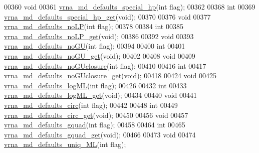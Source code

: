 \begin{DoxyCode}
00360 \textcolor{keywordtype}{void}
00361 \hyperlink{group__model__details_gafff6449a02744add0308e653230c15fc}{vrna\_md\_defaults\_special\_hp}(\textcolor{keywordtype}{int} flag);
00362 
00368 \textcolor{keywordtype}{int}
00369 \hyperlink{group__model__details_ga1d68a6efdaa1253cc63fd9cd06452559}{vrna\_md\_defaults\_special\_hp\_get}(\textcolor{keywordtype}{void});
00370 
00376 \textcolor{keywordtype}{void}
00377 \hyperlink{group__model__details_ga2f88ffc393ac9d7987849c965fd29ea8}{vrna\_md\_defaults\_noLP}(\textcolor{keywordtype}{int} flag);
00378 
00384 \textcolor{keywordtype}{int}
00385 \hyperlink{group__model__details_ga934344888fbacaed538bbbfe910f2aa6}{vrna\_md\_defaults\_noLP\_get}(\textcolor{keywordtype}{void});
00386 
00392 \textcolor{keywordtype}{void}
00393 \hyperlink{group__model__details_ga98218f85c7a957a1d1ddf4627fdf5a39}{vrna\_md\_defaults\_noGU}(\textcolor{keywordtype}{int} flag);
00394 
00400 \textcolor{keywordtype}{int}
00401 \hyperlink{group__model__details_ga5faa7d4e536d7fe36ec25428c0cf2563}{vrna\_md\_defaults\_noGU\_get}(\textcolor{keywordtype}{void});
00402 
00408 \textcolor{keywordtype}{void}
00409 \hyperlink{group__model__details_gade5b9951d71ca2fb357a4e6c0c18ccd1}{vrna\_md\_defaults\_noGUclosure}(\textcolor{keywordtype}{int} flag);
00410 
00416 \textcolor{keywordtype}{int}
00417 \hyperlink{group__model__details_ga4f7fdad083243a5348d63320ddaa70f3}{vrna\_md\_defaults\_noGUclosure\_get}(\textcolor{keywordtype}{void});
00418 
00424 \textcolor{keywordtype}{void}
00425 \hyperlink{group__model__details_ga3de50a73455d88c3957386933b8e1f90}{vrna\_md\_defaults\_logML}(\textcolor{keywordtype}{int} flag);
00426 
00432 \textcolor{keywordtype}{int}
00433 \hyperlink{group__model__details_ga93f04e070d529c5d0bb87c9681f6ad29}{vrna\_md\_defaults\_logML\_get}(\textcolor{keywordtype}{void});
00434 
00440 \textcolor{keywordtype}{void}
00441 \hyperlink{group__model__details_ga4e1deb3e91a8a99e5c6dd905a5eb0186}{vrna\_md\_defaults\_circ}(\textcolor{keywordtype}{int} flag);
00442 
00448 \textcolor{keywordtype}{int}
00449 \hyperlink{group__model__details_gad3a7e58de344ad93a08925f58f94f6fb}{vrna\_md\_defaults\_circ\_get}(\textcolor{keywordtype}{void});
00450 
00456 \textcolor{keywordtype}{void}
00457 \hyperlink{group__model__details_ga0685ca2aeb39af76f2421fc308163dce}{vrna\_md\_defaults\_gquad}(\textcolor{keywordtype}{int} flag);
00458 
00464 \textcolor{keywordtype}{int}
00465 \hyperlink{group__model__details_gae645b8612f879eb38b45244fa9eddb9e}{vrna\_md\_defaults\_gquad\_get}(\textcolor{keywordtype}{void});
00466 
00473 \textcolor{keywordtype}{void}
00474 \hyperlink{group__model__details_ga59b944f61c5d2babec2d4c48c820de67}{vrna\_md\_defaults\_uniq\_ML}(\textcolor{keywordtype}{int} flag);

\end{DoxyCode}
